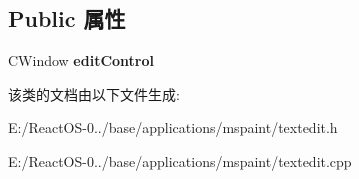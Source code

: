 \subsection*{Public 属性}
\begin{DoxyCompactItemize}
\item 
\mbox{\label{class_c_text_edit_window_a55afc83827a3b65a08c72d2d9a6ac862}} 
C\+Window {\bfseries edit\+Control}
\end{DoxyCompactItemize}


该类的文档由以下文件生成\+:\begin{DoxyCompactItemize}
\item 
E\+:/\+React\+O\+S-\/0../base/applications/mspaint/textedit.\+h\item 
E\+:/\+React\+O\+S-\/0../base/applications/mspaint/textedit.\+cpp\end{DoxyCompactItemize}
